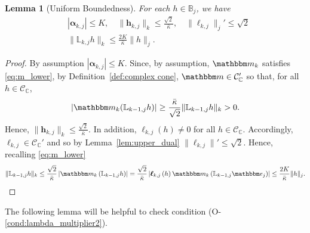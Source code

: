 \documentclass{amsart}
\numberwithin{equation}{section}
\newtheorem{lem}[thm]{Lemma}
\newcommand\cC{{\mathcal C}}
\newcommand\bB{{\mathbb B}}
\newcommand\bC{{\mathbb C}}
\newcommand\bL{{\mathbb L}}
\newcommand{\bbe}{\mathbbm e}
\newcommand{\bbm}{\mathbbm m}
\begin{document}
\begin{lem}[Uniform Boundedness]
\label{lem:boundedness}
For each $h\in\bB_j$, we have
\[
\begin{split}
&|\boldsymbol{\alpha}_{k,j}|\leq K,\quad \|\boldsymbol{h}_{k,j}\|_k \leq \frac{\sqrt 2}{\bar\kappa},\quad \|\boldsymbol{\ell}_{k,j}\|_j'\leq \sqrt 2\\
&\|\bL_{k,j}h\|_k \leq \frac{2K}{\bar\kappa}\|h\|_j.
\end{split}
\]
\end{lem}
\begin{proof}
By assumption $|\boldsymbol{\alpha}_{k,j}|\leq K$.
Since, by assumption, $\bbm_k$ satisfies \eqref{eq:m_lower}, by Definition~\ref{def:complex cone}, $\bbm \in \cC_{\bC}'$ so that, for all $h \in \cC_{\bC}$,
\begin{equation}\label{eq:preliminary_bound}
 \left|\bbm_k(\bL_{k-1,j} h)\right| \geq \frac{\bar \kappa}{\sqrt 2}\|\bL_{k-1,j} h\|_k > 0.
\end{equation}
Hence, $\|\boldsymbol{h}_{k,j}\|_k \leq \frac{\sqrt 2}{\bar\kappa}$. In addition, $\boldsymbol{\ell}_{k,j}(h) \ne 0$ for all $h \in \cC_{\bC}$.  Accordingly,
$\boldsymbol{\ell}_{k,j} \in \cC_{\bC}'$ and so by Lemma~\ref{lem:upper_dual} $\|\boldsymbol{\ell}_{k,j}\|'\leq \sqrt 2$. Hence, recalling \eqref{eq:m_lower}
\[
\|\bL_{k-1,j}h\|_k \leq \frac{\sqrt 2}{\bar\kappa} \left| \bbm_k\left(\bL_{k-1,j}h\right) \right|=\frac{\sqrt 2}{\bar\kappa} \left| \boldsymbol{\ell}_{k,j}\left(h\right)\bbm_k\left(\bL_{k-1,j}\bbe_j\right) \right| \leq \frac{2K}{\bar\kappa}\|h\|_j.
\]
\end{proof}
The following lemma will be helpful to check condition (O-\ref{cond:lambda_multiplier2}).
\end{document}
